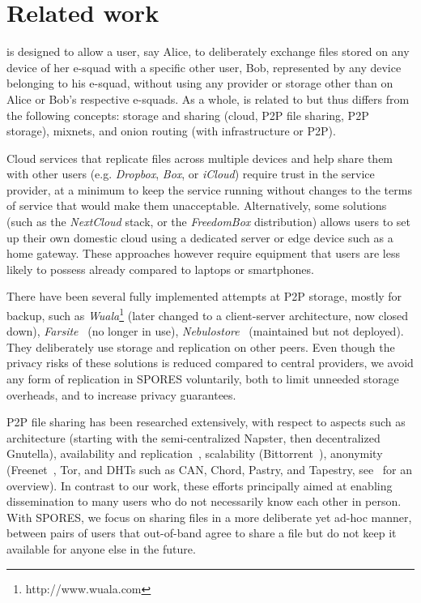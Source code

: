 \section{Related work}%
\label{RelatedWork}

\name is designed to allow a user, say Alice,  to deliberately exchange files stored on any device of her e-squad with a specific other user, Bob, represented by any device belonging to his e-squad, without using any provider or storage other than on Alice or Bob's respective e-squads. As a whole, \name is related to but thus differs from the following concepts: storage and sharing (cloud, P2P file sharing, P2P storage),  mixnets, and onion routing (with infrastructure or P2P).  

Cloud services that replicate files across multiple devices and help share them with other users (e.g. \emph{Dropbox}, \emph{Box}, or \emph{iCloud}) require trust in the service provider, at a minimum to keep the service running without changes to the terms of service that would make them unacceptable. Alternatively, some solutions (such as the \emph{NextCloud} stack, or the \emph{FreedomBox} distribution) allows users to set up their own domestic cloud using a dedicated server or edge device such as a home gateway. These approaches however require equipment that users are less likely to possess already compared to laptops or smartphones. 

There have been several fully implemented attempts at P2P storage, mostly for backup, such as \emph{Wuala}\footnote{http://www.wuala.com} (later changed to a client-server architecture, now closed down), \emph{Farsite}~\cite{farsite} (no longer in use), \emph{Nebulostore}~\cite{nebulo} (maintained but not deployed). They deliberately use storage and replication on other peers. Even though the privacy risks of these solutions is reduced compared to central providers, we avoid any form of replication in \ac{SPORES} voluntarily, both to limit unneeded storage overheads, and to increase privacy guarantees.

P2P file sharing has been researched extensively, with respect to aspects such 
as architecture (starting with the semi-centralized Napster, then decentralized 
Gnutella), availability and replication~\cite{replica}, scalability 
(Bittorrent~\cite{bittorrent-incentives}), anonymity 
(Freenet~\cite{Clarke:2001}, Tor, and \acp{DHT} such as CAN, Chord, 
Pastry, and Tapestry, see~\cite{dhtchurn} for an overview). In contrast to our 
work, these efforts principally aimed at enabling dissemination to many users 
who do not necessarily know each other in person. With \ac{SPORES}, we focus on 
sharing files in a more deliberate yet ad-hoc manner, \ie between pairs of 
users that out-of-band agree to share a file but do not keep it available for 
anyone else in the future. 

